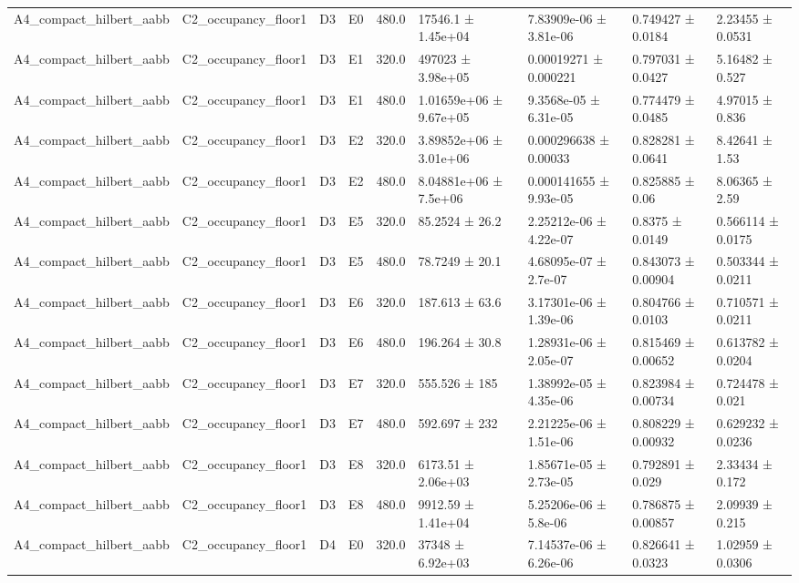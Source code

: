 \begin{table}
\begin{tabular}{lllllllll}
A4\_compact\_hilbert\_aabb & C2\_occupancy\_floor1 & D3 & E0 & 480.0 & 17546.1 ± 1.45e+04 & 7.83909e-06 ± 3.81e-06 & 0.749427 ± 0.0184 & 2.23455 ± 0.0531 \\
A4\_compact\_hilbert\_aabb & C2\_occupancy\_floor1 & D3 & E1 & 320.0 & 497023 ± 3.98e+05 & 0.00019271 ± 0.000221 & 0.797031 ± 0.0427 & 5.16482 ± 0.527 \\
A4\_compact\_hilbert\_aabb & C2\_occupancy\_floor1 & D3 & E1 & 480.0 & 1.01659e+06 ± 9.67e+05 & 9.3568e-05 ± 6.31e-05 & 0.774479 ± 0.0485 & 4.97015 ± 0.836 \\
A4\_compact\_hilbert\_aabb & C2\_occupancy\_floor1 & D3 & E2 & 320.0 & 3.89852e+06 ± 3.01e+06 & 0.000296638 ± 0.00033 & 0.828281 ± 0.0641 & 8.42641 ± 1.53 \\
A4\_compact\_hilbert\_aabb & C2\_occupancy\_floor1 & D3 & E2 & 480.0 & 8.04881e+06 ± 7.5e+06 & 0.000141655 ± 9.93e-05 & 0.825885 ± 0.06 & 8.06365 ± 2.59 \\
A4\_compact\_hilbert\_aabb & C2\_occupancy\_floor1 & D3 & E5 & 320.0 & 85.2524 ± 26.2 & 2.25212e-06 ± 4.22e-07 & 0.8375 ± 0.0149 & 0.566114 ± 0.0175 \\
A4\_compact\_hilbert\_aabb & C2\_occupancy\_floor1 & D3 & E5 & 480.0 & 78.7249 ± 20.1 & 4.68095e-07 ± 2.7e-07 & 0.843073 ± 0.00904 & 0.503344 ± 0.0211 \\
A4\_compact\_hilbert\_aabb & C2\_occupancy\_floor1 & D3 & E6 & 320.0 & 187.613 ± 63.6 & 3.17301e-06 ± 1.39e-06 & 0.804766 ± 0.0103 & 0.710571 ± 0.0211 \\
A4\_compact\_hilbert\_aabb & C2\_occupancy\_floor1 & D3 & E6 & 480.0 & 196.264 ± 30.8 & 1.28931e-06 ± 2.05e-07 & 0.815469 ± 0.00652 & 0.613782 ± 0.0204 \\
A4\_compact\_hilbert\_aabb & C2\_occupancy\_floor1 & D3 & E7 & 320.0 & 555.526 ± 185 & 1.38992e-05 ± 4.35e-06 & 0.823984 ± 0.00734 & 0.724478 ± 0.021 \\
A4\_compact\_hilbert\_aabb & C2\_occupancy\_floor1 & D3 & E7 & 480.0 & 592.697 ± 232 & 2.21225e-06 ± 1.51e-06 & 0.808229 ± 0.00932 & 0.629232 ± 0.0236 \\
A4\_compact\_hilbert\_aabb & C2\_occupancy\_floor1 & D3 & E8 & 320.0 & 6173.51 ± 2.06e+03 & 1.85671e-05 ± 2.73e-05 & 0.792891 ± 0.029 & 2.33434 ± 0.172 \\
A4\_compact\_hilbert\_aabb & C2\_occupancy\_floor1 & D3 & E8 & 480.0 & 9912.59 ± 1.41e+04 & 5.25206e-06 ± 5.8e-06 & 0.786875 ± 0.00857 & 2.09939 ± 0.215 \\
A4\_compact\_hilbert\_aabb & C2\_occupancy\_floor1 & D4 & E0 & 320.0 & 37348 ± 6.92e+03 & 7.14537e-06 ± 6.26e-06 & 0.826641 ± 0.0323 & 1.02959 ± 0.0306 \\

\end{tabular}
\end{table}
